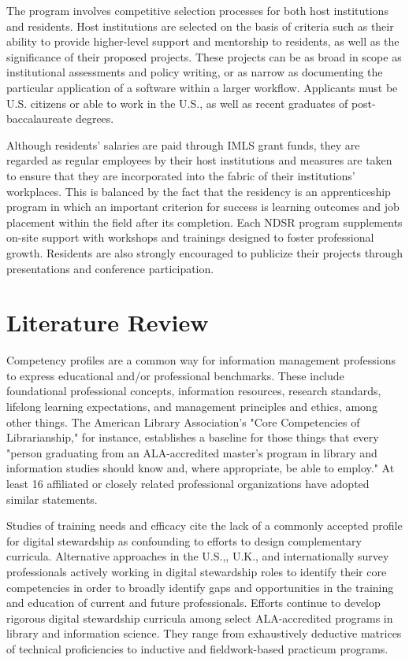 \documentclass{acm_proc_article-sp}
\begin{document}
The program involves competitive selection processes for both host institutions and residents. Host institutions are selected on the basis of criteria such as their ability to provide higher-level support and mentorship to residents, as well as the significance of their proposed projects. These projects can be as broad in scope as institutional assessments and policy writing, or as narrow as documenting the particular application of a software within a larger workflow. Applicants must be U.S. citizens or able to work in the U.S., as well as recent graduates of post-baccalaureate degrees. 

Although residents' salaries are paid through IMLS grant funds, they are regarded as regular employees by their host institutions and measures are taken to ensure that they are incorporated into the fabric of their institutions' workplaces. This is balanced by the fact that the residency is an apprenticeship program in which an important criterion for success is learning outcomes and job placement within the field after its completion. Each NDSR program supplements on-site support with workshops and trainings designed to foster professional growth. Residents are also strongly encouraged to publicize their projects through presentations and conference participation. 

\section{Literature Review}
Competency profiles are a common way for information management professions to express educational and/or professional benchmarks. These include foundational professional concepts, information resources, research standards, lifelong learning expectations, and management principles and ethics, among other things. The American Library Association's "Core Competencies of Librarianship," for instance, establishes a baseline for those things that every "person graduating from an ALA-accredited master's program in library and information studies should know and, where appropriate, be able to employ."\cite{4} At least 16 affiliated or closely related professional organizations have adopted similar statements. \cite{5}

Studies of training needs and efficacy \cite{6, 7, 8} cite the lack of a commonly accepted profile for digital stewardship as confounding to efforts to design complementary curricula. Alternative approaches in the U.S.,\cite{9, 10}, U.K.\cite{11}, and internationally\cite{12, 13} survey professionals actively working in digital stewardship roles to identify their core competencies in order to broadly identify gaps and opportunities in the training and education of current and future professionals. Efforts continue to develop rigorous digital stewardship curricula among select ALA-accredited programs in library and information science. They range from exhaustively deductive matrices of technical proficiencies\cite{14} to inductive and fieldwork-based practicum programs.\cite{15}
\end{document}
